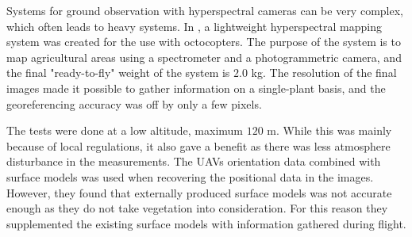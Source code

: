 Systems for ground observation with hyperspectral cameras can be very complex, which often leads to heavy systems. In \cite{hymsySUOMALAINEN}, a lightweight hyperspectral mapping system was created for the use with octocopters. The purpose of the system is to map agricultural areas using a spectrometer and a photogrammetric camera, and the final "ready-to-fly" weight of the system is $2.0$ kg. The resolution of the final images made it possible to gather information on a single-plant basis, and the georeferencing accuracy was off by only a few pixels.

The tests were done at a low altitude, maximum $120$ m. While this was mainly because of local regulations, it also gave a benefit as there was less atmosphere disturbance in the measurements. The UAVs orientation data combined with surface models was used when recovering the positional data in the images. However, they found that externally produced surface models was not accurate enough as they do not take vegetation into consideration. For this reason they supplemented the existing surface models with information gathered during flight.